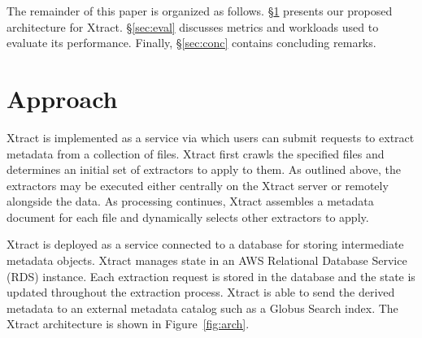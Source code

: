 \documentclass[sigconf]{acmart}
\newcommand{\tyler}[1]{}
\newcommand{\tyler}[1]{{\textcolor{cyan}{ tyler: #1 }}}
\newcommand{\name}{Xtract}
\begin{document}
The remainder of this paper is organized as follows. 
\S\ref{sec:approach} presents our proposed architecture for \name{}. 
\S\ref{sec:eval} discusses metrics and workloads used to evaluate its performance. 
Finally, \S\ref{sec:conc} contains concluding remarks.


\section{Approach}
\label{sec:approach}
\tyler{Need to make this slightly more high-level. Probably shouldn't 
say anything about AWS in here...}
\name{} is implemented as a service via which users can submit
requests to extract metadata from a collection of files.
\name{} first crawls the specified files and determines
an initial set of extractors to apply to them. 
As outlined above, the extractors may be executed
either centrally on the \name{} server or remotely alongside
the data. As processing continues, \name{} assembles 
a metadata document for each file and dynamically selects
other extractors to apply.


\name{} is deployed as a service connected to a database for storing 
intermediate metadata objects.
\name{} manages state in an AWS Relational Database Service (RDS)
instance. Each extraction request is stored in the database
and the state is updated throughout the extraction process. 
\name{} is able to send the derived metadata to an external
metadata catalog such as a Globus Search index.
The \name{} architecture is shown in Figure~\ref{fig:arch}.
\end{document}
